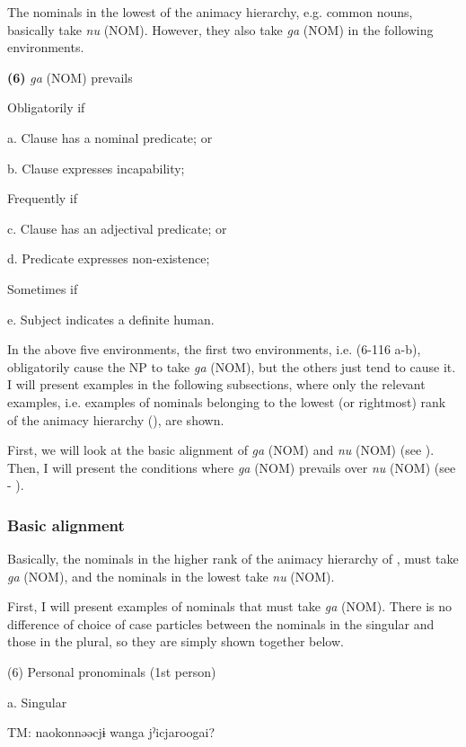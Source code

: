 The nominals in the lowest of the animacy hierarchy, e.g. common nouns, basically take \textit{nu} (NOM). However, they also take \textit{ga} (NOM) in the following environments.

\textbf{(6)}  \textit{ga} (NOM) prevails

  Obligatorily if

  a.  Clause has a nominal predicate; or

  b.  Clause expresses incapability;

  Frequently if

  c.  Clause has an adjectival predicate; or

  d.  Predicate expresses non-existence;

  Sometimes if

  e.  Subject indicates a definite human.

In the above five environments, the first two environments, i.e. (6-116 a-b), obligatorily cause the NP to take \textit{ga} (NOM), but the others just tend to cause it. I will present examples in the following subsections, where only the relevant examples, i.e. examples of nominals belonging to the lowest (or rightmost) rank of the animacy hierarchy (), are shown.

  First, we will look at the basic alignment of \textit{ga} (NOM) and \textit{nu} (NOM) (see ). Then, I will present the conditions where \textit{ga} (NOM) prevails over \textit{nu} (NOM) (see  - ).

\subsubsection{Basic alignment}

Basically, the nominals in the higher rank of the animacy hierarchy of , must take \textit{ga} (NOM), and the nominals in the lowest take \textit{nu} (NOM).

First, I will present examples of nominals that must take \textit{ga} (NOM). There is no difference of choice of case particles between the nominals in the singular and those in the plural, so they are simply shown together below.

(6)  Personal pronominals (1st person)

  a.  Singular

    TM:  naokonnəəcjɨ  wanga  jˀicjaroogai?

